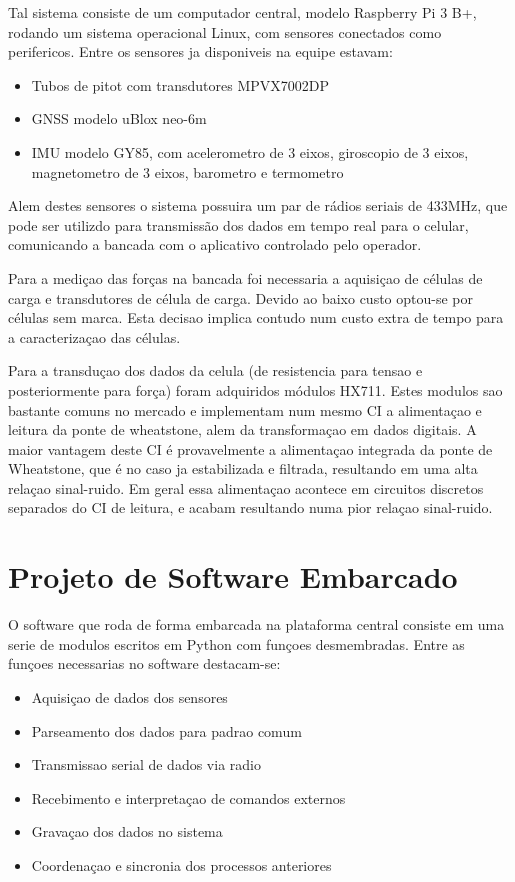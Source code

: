 Tal sistema consiste de um computador central, modelo Raspberry Pi 3 B+, rodando um sistema operacional Linux, com sensores conectados como perifericos. Entre os sensores ja disponiveis na equipe estavam:

\begin{itemize}
    \item Tubos de pitot com transdutores MPVX7002DP
    \item GNSS modelo uBlox neo-6m
    \item IMU modelo GY85, com acelerometro de 3 eixos, giroscopio de 3 eixos, magnetometro de 3 eixos, barometro e termometro
\end{itemize}

Alem destes sensores o sistema possuira um par de rádios seriais de 433MHz, que pode ser utilizdo para transmissão dos dados em tempo real para o celular, comunicando a bancada com o aplicativo controlado pelo operador.

Para a mediçao das forças na bancada foi necessaria a aquisiçao de células de carga e transdutores de célula de carga. Devido ao baixo custo optou-se por células sem marca. Esta decisao implica contudo num custo extra de tempo para a caracterizaçao das células.

Para a transduçao dos dados da celula (de resistencia para tensao e posteriormente para força) foram adquiridos módulos HX711. Estes modulos sao bastante comuns no mercado e implementam num mesmo CI a alimentaçao e leitura da ponte de wheatstone, alem da transformaçao em dados digitais. A maior vantagem deste CI é provavelmente a alimentaçao integrada da ponte de Wheatstone, que é no caso ja estabilizada e filtrada, resultando em uma alta relaçao sinal-ruido. Em geral essa alimentaçao acontece em circuitos discretos separados do CI de leitura, e acabam resultando numa pior relaçao sinal-ruido.

\section{Projeto de Software Embarcado}

O software que roda de forma embarcada na plataforma central consiste em uma serie de modulos escritos em Python com funçoes desmembradas. Entre as funçoes necessarias no software destacam-se:

\begin{itemize}
    \item Aquisiçao de dados dos sensores
    \item Parseamento dos dados para padrao comum
    \item Transmissao serial de dados via radio
    \item Recebimento e interpretaçao de comandos externos
    \item Gravaçao dos dados no sistema
    \item Coordenaçao e sincronia dos processos anteriores
\end{itemize}


